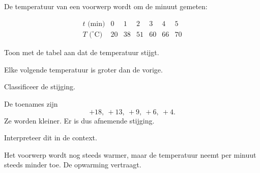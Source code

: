 \documentclass{ximera}
\begin{document}
\begin{oefening}{\oefU\ESS}

De temperatuur van een voorwerp wordt om de minuut gemeten:

\[
\begin{array}{c|rrrrrr}
t\text{ (min)}&0&1&2&3&4&5\\ \hline
T\text{ (}^{\circ}\mathrm C\text{)}&20&38&51&60&66&70
\end{array}
\]

\begin{question}
Toon met de tabel aan dat de temperatuur stijgt.
\begin{oplossing}
Elke volgende temperatuur is groter dan de vorige.
\end{oplossing}
\end{question}

\begin{question}
Classificeer de stijging.
\begin{oplossing}
De toenames zijn
\[
+18,\ +13,\ +9,\ +6,\ +4.
\]
Ze worden kleiner. Er is dus afnemende stijging.
\end{oplossing}
\end{question}

\begin{question}
Interpreteer dit in de context.
\begin{oplossing}
Het voorwerp wordt nog steeds warmer, maar de temperatuur neemt per minuut
steeds minder toe. De opwarming vertraagt.
\end{oplossing}
\end{question}

\end{oefening}
\end{document}
